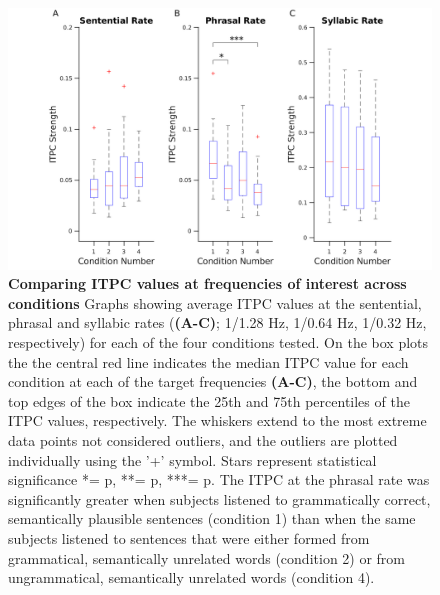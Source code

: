 \documentclass[10pt,letterpaper]{article}
\begin{document}
\begin{figure}[tbhp]
\includegraphics[width=\linewidth]{ITPC_peaks_per_condition.png}
\caption{\textbf{Comparing ITPC values at frequencies of interest
    across conditions} Graphs showing average ITPC values at the
  sentential, phrasal and syllabic rates (\textbf{(A-C)}; 1/1.28 Hz,
  1/0.64 Hz, 1/0.32 Hz, respectively) for each of the four conditions
  tested. On the box plots the the central red line indicates the
  median ITPC value for each condition at each of the target
  frequencies \textbf{(A-C)}, the bottom and top edges of the box
  indicate the 25th and 75th percentiles of the ITPC values,
  respectively. The whiskers extend to the most extreme data points
  not considered outliers, and the outliers are plotted individually
  using the '+' symbol. Stars represent statistical significance *=
  p, **= p, ***= p. The ITPC at the phrasal rate was
  significantly greater when subjects listened to grammatically
  correct, semantically plausible sentences (condition 1) than when the same
  subjects listened to sentences that were either formed from grammatical,
  semantically unrelated words (condition 2) or from ungrammatical,
  semantically unrelated words (condition 4).}
\label{ITPC_peaks}
\end{figure}




\end{document}
